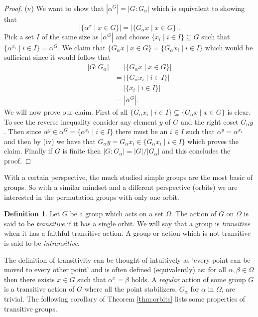 \documentclass[]{article}
\theoremstyle{definition}
\newtheorem{defn}[thm]{Definition}
\begin{document}
\begin{proof}
(v) We want to show that $ |\alpha^G| = |G:G_\alpha|$ which is equivalent to showing that 
    $$|\{ \alpha^x \; | \; x \in G \}| = |\{G_\alpha x \; | \; x \in G \}|.$$
    Pick a set $I$ of the same size as $|\alpha^G|$ and choose $\{ x_i \; | \; i \in I \} \subseteq G$ such that $\{\alpha^{x_i} \; | \; i \in I \} = \alpha^G$. We claim that $\{G_\alpha x \; | \; x \in G \} = \{G_\alpha x_i \; | \; i \in I \}$ which would be sufficient since it would follow that
\begin{align*}
|G:G_\alpha| & = |\{G_\alpha x \; | \; x \in G \}| \\ & = |\{G_\alpha x_i \; | \; i \in I \}| \\ & = |\{ x_i \; | \; i \in I \}| \\ & = |\alpha^G|.
\end{align*}    
We will now prove our claim. First of all $\{G_\alpha x_i \; | \; i \in I \} \subseteq \{G_\alpha x \; | \; x \in G \}$ is clear. To see the reverse inequality consider any element $y$ of $G$ and the right coset $G_\alpha y$. Then since $\alpha^y \in \alpha^G = \{\alpha^{x_i} \; | \; i \in I \}$ there must be an $i \in I$ such that $\alpha^y = \alpha^{x_i}$ and then by (iv) we have that $G_\alpha y = G_\alpha x_i \in \{G_\alpha x_i \; | \; i \in I \}$ which proves the claim. Finally if $G$ is finite then $|G:G_\alpha| = |G|/|G_\alpha|$ and this concludes the proof.
\end{proof}

With a certain perspective, the much studied simple groups are the most basic of groups. So with a similar mindset and a different perspective (orbits) we are interested in the permutation groups with only one orbit.

\begin{defn}
	Let $G$ be a group which acts on a set $\Omega$. The action of $G$ on $\Omega$ is said to be \emph{transitive} if it has a single orbit. We will say that a group is \emph{transitive} when it has a faithful transitive action. A group or action which is not transitive is said to be \emph{intransitive}.
\end{defn}

The definition of transitivity can be thought of intuitively as 'every point can be moved to every other point' and is often defined (equivalently) as: for all $\alpha, \beta \in \Omega$ then there exists $x \in G$ such that $\alpha^x = \beta$ holds. A \emph{regular} action of some group $G$ is a transitive action of $G$ where all the point stabilizers, $G_\alpha$ for $\alpha$ in $\Omega$, are trivial. The following corollary of Theorem \ref{thm:orbits} lists some properties of transitive groups.
\end{document}
